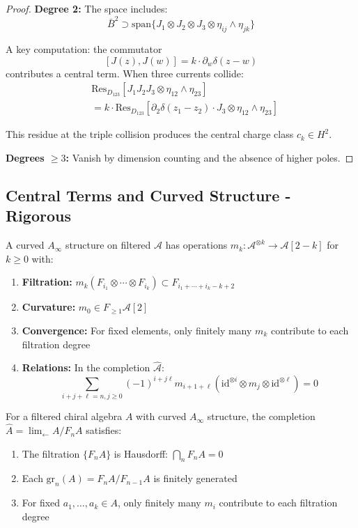 \begin{proof}
\textbf{Degree 2:} The space includes:
\[
\bar{B}^2 \supset \text{span}\{J_1 \otimes J_2 \otimes J_3 \otimes \eta_{ij} \wedge \eta_{jk}\}
\]
 
A key computation: the commutator
\[
[J(z), J(w)] = k \cdot \partial_w\delta(z-w)
\]
contributes a central term. When three currents collide:
\begin{align}
&\text{Res}_{D_{123}}[J_1J_2J_3 \otimes \eta_{12} \wedge \eta_{23}] \\
&= k \cdot \text{Res}_{D_{123}}[\partial_2\delta(z_1-z_2) \cdot J_3 \otimes \eta_{12} \wedge \eta_{23}]
\end{align}
 
This residue at the triple collision produces the central charge class $c_k \in H^2$.
 
\textbf{Degrees $\geq 3$:} Vanish by dimension counting and the absence of higher poles.
\end{proof}
 
\subsection{Central Terms and Curved Structure - Rigorous}

\begin{definition}
A curved $A_\infty$ structure on filtered $\mathcal{A}$ has operations $m_k: \mathcal{A}^{\otimes k} \to \mathcal{A}[2-k]$ for $k \geq 0$ with:
\begin{enumerate}
\item \textbf{Filtration:} $m_k(F_{i_1} \otimes \cdots \otimes F_{i_k}) \subset F_{i_1+\cdots+i_k-k+2}$
\item \textbf{Curvature:} $m_0 \in F_{\geq 1}\mathcal{A}[2]$
\item \textbf{Convergence:} For fixed elements, only finitely many $m_k$ contribute to each filtration degree
\item \textbf{Relations:} In the completion $\widehat{\mathcal{A}}$:
   $$\sum_{i+j+\ell=n, j \geq 0} (-1)^{i+j\ell} m_{i+1+\ell}(\text{id}^{\otimes i} \otimes m_j \otimes \text{id}^{\otimes \ell}) = 0$$
\end{enumerate}
\end{definition}

\begin{proposition}\label{prop:curved-convergence}
For a filtered chiral algebra $A$ with curved $A_\infty$ structure, the completion $\hat{A} = \lim_{\leftarrow} A/F_nA$ satisfies:
\begin{enumerate}
\item The filtration $\{F_nA\}$ is Hausdorff: $\bigcap_n F_nA = 0$
\item Each $\text{gr}_n(A) = F_nA/F_{n-1}A$ is finitely generated
\item For fixed $a_1, \ldots, a_k \in A$, only finitely many $m_i$ contribute to each filtration degree
\end{enumerate}
\end{proposition}


